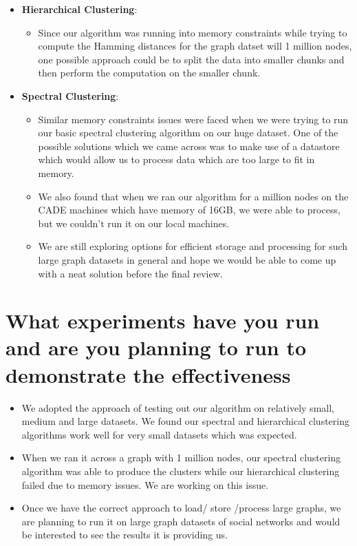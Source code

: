 \documentclass[11pt]{exam}
\begin{document}
\begin{itemize}

\item \textbf{ Hierarchical Clustering}:

\begin{itemize}
	\item  Since our algorithm was running into memory constraints while trying to compute the Hamming distances for the graph datset will 1 million nodes, one possible approach could be to split the data into smaller chunks and then perform the computation on the smaller chunk.
	
\end{itemize}	
	
\item \textbf{ Spectral Clustering}:
\begin{itemize}
	\item Similar memory constraints issues were faced when we were trying to run our basic spectral clustering algorithm on our huge dataset. One of the possible solutions which we came across was to make use of a datastore which would allow us to process data which are too large to fit in memory.
	\item We also found that when we ran our algorithm for a million nodes on the CADE machines which have memory of 16GB, we were able to process, but we couldn't run it on our local machines.
	\item We are still exploring options for efficient storage and processing for such large graph datasets in general and hope we would be able to come up with a neat solution before the final review.
\end{itemize}
\end{itemize}
\section{What experiments have you run and are you planning to run to demonstrate the effectiveness}

\begin{itemize}

\item We adopted the approach of testing out our algorithm on relatively small, medium and large datasets. We found our spectral and hierarchical clustering algorithms work well for very small datasets which was expected.

\item When we ran it across a graph with 1 million nodes, our spectral clustering algorithm was able to produce the clusters while our hierarchical clustering failed due to memory issues. We are working on this issue.

\item Once we have the correct approach to load/ store /process large graphs, we are planning to run it on large graph datasets of social networks and would be interested to see the results it is providing us.
\end{itemize}
\end{document}
